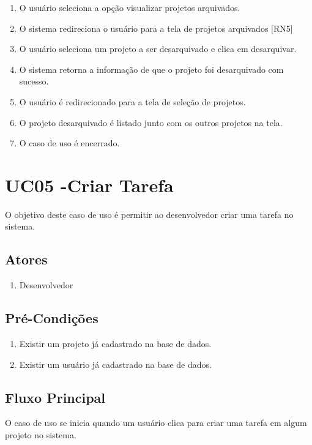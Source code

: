 \begin{enumerate}
  \item O usuário seleciona a opção visualizar projetos arquivados.
  \item O sistema redireciona o usuário para a tela de projetos arquivados [RN5]
  \item O usuário seleciona um projeto a ser desarquivado e clica em desarquivar.
  \item O sistema retorna a informação de que o projeto foi desarquivado com sucesso.
  \item O usuário é redirecionado para a tela de seleção de projetos.
  \item O projeto desarquivado é listado junto com os outros projetos na tela.
  \item O caso de uso é encerrado.
\end{enumerate}

\section{UC05 -Criar Tarefa}
O objetivo deste caso de uso é permitir ao desenvolvedor criar uma tarefa no sistema.

\subsection{Atores}

\begin{enumerate}
  \item Desenvolvedor
\end{enumerate}

\subsection{Pré-Condições}
\begin{enumerate}
  \item Existir um projeto já cadastrado na base de dados.
  \item Existir um usuário já cadastrado na base de dados.
\end{enumerate}

\subsection{Fluxo Principal}
O caso de uso se inicia quando um usuário clica para criar uma tarefa em algum projeto no sistema.

